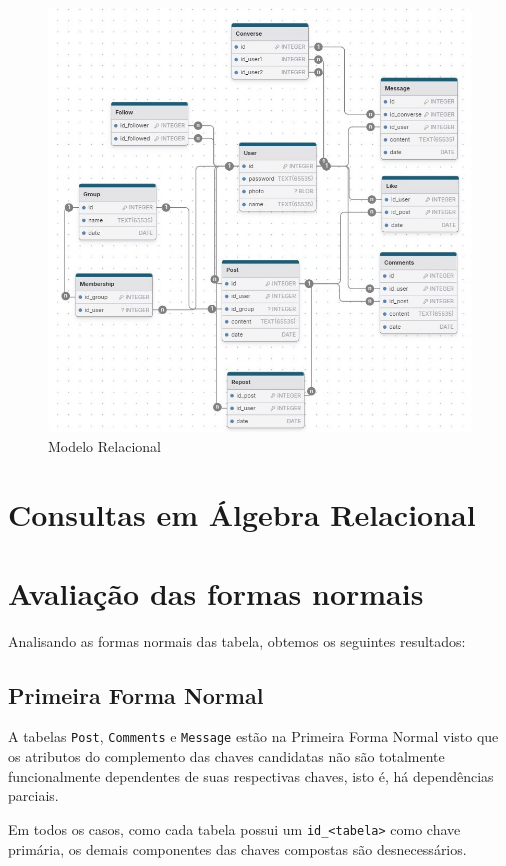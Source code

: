 \documentclass{article}
\begin{document}
\begin{figure}[!ht]
        \centering
        \includegraphics[width=1\textwidth]{imagens/mr.jpg}
        \caption{Modelo Relacional}
\end{figure}

\section{Consultas em Álgebra Relacional}

\section{Avaliação das formas normais}
Analisando as formas normais das tabela, obtemos os seguintes resultados:
\subsection{Primeira Forma Normal}
A tabelas \verb|Post|, \verb|Comments| e \verb|Message| estão na Primeira Forma Normal visto que os atributos do complemento das chaves candidatas não são totalmente funcionalmente dependentes de suas respectivas chaves, isto é, há dependências parciais.

Em todos os casos, como cada tabela possui um \verb|id_<tabela>| como chave primária, os demais componentes das chaves compostas são desnecessários.
\end{document}
